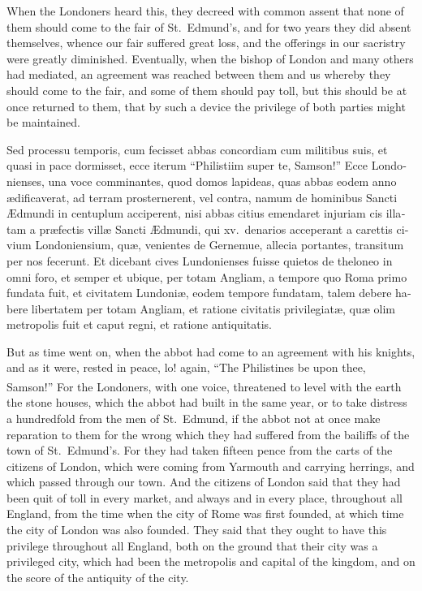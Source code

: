 \documentclass{book}
\newcounter{engnote}
\newcommand{\engnotenum}{\textsuperscript{\arabic{engnote}\stepcounter{engnote}}}
\newcommand{\engnotetext}[1]{\vphantom{\footnotemark{}}\footnotetext{#1}}
\begin{document}
\begin{paracol}{2}
\switchcolumn

When the Londoners heard this, they decreed with common assent that none of them should come to the fair of St.\ Edmund's, and for two years they did absent themselves, whence our fair suffered great loss, and the offerings in our sacristry were greatly diminished. Eventually, when the bishop of London and many others had mediated, an agreement was reached between them and us whereby they should come to the fair, and some of them should pay toll, but this should be at once returned to them, that by such a device the privilege of both parties might be maintained.

\switchcolumn*

\begin{otherlanguage}{latin}
Sed processu temporis, cum fecisset abbas concordiam cum militibus suis, et quasi in pace dormisset, ecce iterum ``Philistiim super te, Samson!''\engnotetext{Jud.\ xvi., \oldstylenums{9}.} Ecce Londonienses, una voce comminantes, quod domos lapideas, quas abbas eodem anno \ae{}dificaverat, ad terram prosternerent, vel contra, namum de hominibus Sancti \AE{}dmundi in centuplum acciperent, nisi abbas citius emendaret injuriam cis illatam a pr\ae{}fectis vill\ae{} Sancti \AE{}dmundi, qui xv.\ denarios acceperant a carettis civium Londoniensium, qu\ae{}, venientes de Gernemue, allecia portantes, transitum per nos fecerunt. Et dicebant cives Lundonienses fuisse quietos de theloneo in omni foro, et semper et ubique, per totam Angliam, a tempore quo Roma primo fundata fuit, et civitatem Lundoni\ae{}, eodem tempore fundatam, talem debere habere libertatem per totam Angliam, et ratione civitatis privilegiat\ae{}, qu\ae{} olim metropolis fuit et caput regni, et ratione antiquitatis.
\end{otherlanguage}

\switchcolumn

But as time went on, when the abbot had come to an agreement with his knights, and as it were, rested in peace, lo! again, ``The Philistines be upon thee, Samson!''\engnotenum{} For the Londoners, with one voice, threatened to level with the earth the stone houses, which the abbot had built in the same year, or to take distress a hundredfold from the men of St.\ Edmund, if the abbot not at once make reparation to them for the wrong which they had suffered from the bailiffs of the town of St.\ Edmund's. For they had taken fifteen pence from the carts of the citizens of London, which were coming from Yarmouth and carrying herrings, and which passed through our town. And the citizens of London said that they had been quit of toll in every market, and always and in every place, throughout all England, from the time when the city of Rome was first founded, at which time the city of London was also founded. They said that they ought to have this privilege throughout all England, both on the ground that their city was a privileged city, which had been the metropolis and capital of the kingdom, and on the score of the antiquity of the city.


\end{paracol}
\end{document}
